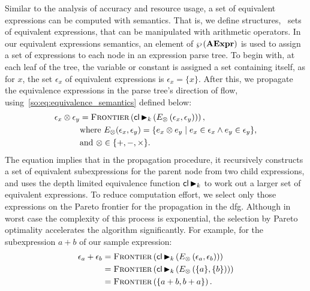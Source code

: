 Similar to the analysis of accuracy and resource usage, a set of equivalent
expressions can be computed with semantics. That is, we define structures,
\ie~sets of equivalent expressions, that can be manipulated with arithmetic
operators. In our equivalent expressions semantics, an element of
$\wp\left({\mathbf{AExpr}}\right)$ is used to assign a set of expressions to each node
in an expression parse tree. To begin with, at each leaf of the tree, the
variable or constant is assigned a set containing itself, as for $x$, the set
$\epsilon_x$ of equivalent expressions is $\epsilon_x = \{x\}$. After this, we
propagate the equivalence expressions in the parse tree's direction of flow,
using~\eqref{so:eq:equivalence_semantics} defined below:
\begin{equation}
    \begin{aligned}
        \epsilon_x \otimes \epsilon_y &= \operatorname{\textsc{Frontier}}\left(
            \mathsf{cl} \operatorname{\blacktriangleright}_k \left(
                E_\otimes \left( \epsilon_x, \epsilon_y \right)
            \right) \right), \\
        & \text{where~}
        E_\otimes(\epsilon_x, \epsilon_y) = \{
            e_x \otimes e_y \mid e_x \in \epsilon_x \wedge e_y \in \epsilon_y
        \}, \\
        & \text{and~} \otimes\in\{+, -, \times\}.
    \end{aligned}
    \label{so:eq:equivalence_semantics}
\end{equation}
The equation implies that in the propagation procedure, it recursively
constructs a set of equivalent subexpressions for the parent node from two
child expressions, and uses the depth limited equivalence function $\mathsf{cl}
\operatorname{\blacktriangleright}_k$ to work out a larger set of equivalent expressions. To reduce
computation effort, we select only those expressions on the Pareto frontier
for the propagation in the \gls{dfg}\@. Although in worst case the complexity
of this process is exponential, the selection by Pareto optimality accelerates
the algorithm significantly. For example, for the subexpression $a + b$ of our
sample expression:
\begin{equation}
    \begin{aligned}
        \epsilon_a + \epsilon_b
            &= \operatorname{\textsc{Frontier}}\left(
                    \mathsf{cl} \operatorname{\blacktriangleright}_k \left(
                        E_\otimes \left( \epsilon_a, \epsilon_b \right)
                    \right)
                \right) \\
            &= \operatorname{\textsc{Frontier}}\left(
                    \mathsf{cl} \operatorname{\blacktriangleright}_k \left(
                        E_\otimes \left( \{a\}, \{b\} \right)
                    \right)
                \right) \\
            &= \operatorname{\textsc{Frontier}}\left(
                    \{ a + b, b + a \}
                \right).
    \end{aligned}
\end{equation}
